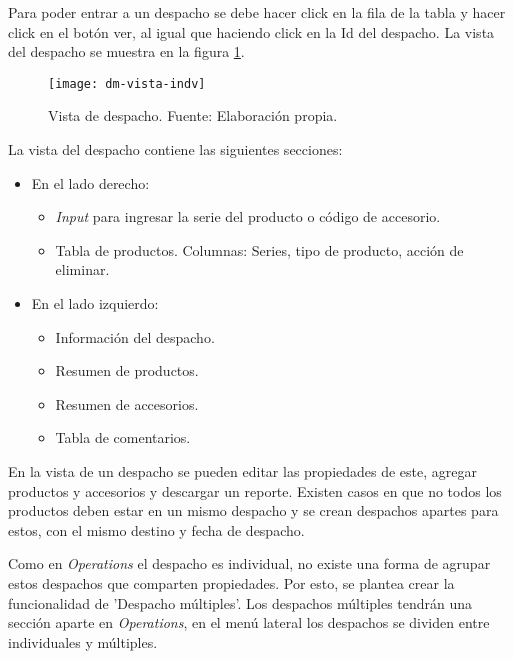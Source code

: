 Para poder entrar a un despacho se debe hacer click en la fila de la tabla y hacer click en el botón ver, al igual que haciendo click en la Id del despacho.
La vista del despacho se muestra en la figura \ref{fig:dm-vista-indv}.

\begin{figure}[H]
	\centering
	\texttt{[image: dm-vista-indv]}
	\caption{\label{fig:dm-vista-indv} Vista de despacho. Fuente: Elaboración propia.}
\end{figure}

La vista del despacho contiene las siguientes secciones:
\begin{itemize}
    \item En el lado derecho:
    \begin{itemize}
        \item \textit{Input} para ingresar la serie del producto o código de accesorio.
        \item Tabla de productos. Columnas: Series, tipo de producto, acción de eliminar.
    \end{itemize}
    \item En el lado izquierdo:
    \begin{itemize}
        \item Información del despacho.
        \item Resumen de productos.
        \item Resumen de accesorios.
        \item Tabla de comentarios.
    \end{itemize}
\end{itemize}

En la vista de un despacho se pueden editar las propiedades de este, agregar productos y accesorios y descargar un reporte. Existen casos en que no todos los productos deben estar en un mismo despacho y se crean despachos apartes para estos, con el mismo destino y fecha de despacho.

Como en \textit{Operations} el despacho es individual, no existe una forma de agrupar estos despachos que comparten propiedades. Por esto, se plantea crear la funcionalidad de 'Despacho múltiples'. 
Los despachos múltiples tendrán una sección aparte en \textit{Operations}, en el menú lateral los despachos se dividen entre individuales y múltiples.

